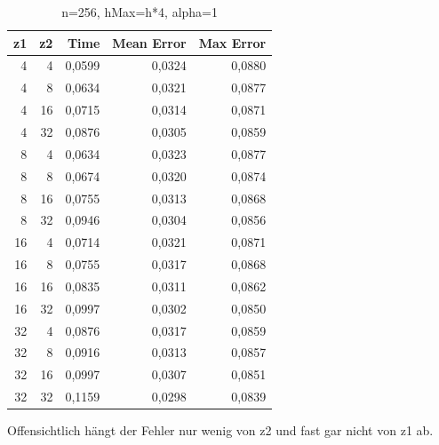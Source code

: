 \documentclass[paper = a4]{scrartcl}
\begin{document}
\begin{table}
    \centering
    \begin{tabular}{|r|r|r|r|r|} \hline
    z1 & z2 & Time   & Mean Error & Max Error \\ \hline \hline
    4  & 4  & 0,0599 & 0,0324     & 0,0880    \\
    4  & 8  & 0,0634 & 0,0321     & 0,0877    \\
    4  & 16 & 0,0715 & 0,0314     & 0,0871    \\
    4  & 32 & 0,0876 & 0,0305     & 0,0859    \\ \hline
    8  & 4  & 0,0634 & 0,0323     & 0,0877    \\
    8  & 8  & 0,0674 & 0,0320     & 0,0874    \\
    8  & 16 & 0,0755 & 0,0313     & 0,0868    \\
    8  & 32 & 0,0946 & 0,0304     & 0,0856    \\ \hline
    16 & 4  & 0,0714 & 0,0321     & 0,0871    \\
    16 & 8  & 0,0755 & 0,0317     & 0,0868    \\
    16 & 16 & 0,0835 & 0,0311     & 0,0862    \\
    16 & 32 & 0,0997 & 0,0302     & 0,0850    \\ \hline
    32 & 4  & 0,0876 & 0,0317     & 0,0859    \\
    32 & 8  & 0,0916 & 0,0313     & 0,0857    \\
    32 & 16 & 0,0997 & 0,0307     & 0,0851    \\
    32 & 32 & 0,1159 & 0,0298     & 0,0839    \\ \hline
    \end{tabular}
    \caption{n=256, hMax=h*4, alpha=1}
\end{table}

Offensichtlich hängt der Fehler nur wenig von z2 und fast gar nicht von z1 ab.
\end{document}
